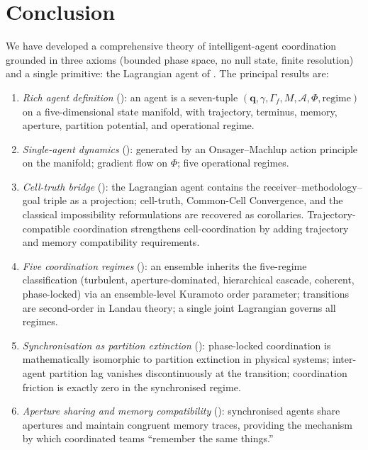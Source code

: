 \documentclass[11pt,twocolumn,a4paper]{article}
\newcommand{\Aper}{\mathcal{A}}
\newcommand{\qvec}{\mathbf{q}}
\newcommand{\Pot}{\Phi}
\begin{document}
\section{Conclusion}
\label{sec:conclusion}

We have developed a comprehensive theory of intelligent-agent
coordination grounded in three axioms (bounded phase space, no null
state, finite resolution) and a single primitive: the Lagrangian
agent of . The principal results are:

\begin{enumerate}[label=(\arabic*),leftmargin=*]
\item \emph{Rich agent definition} (): an agent is a
seven-tuple
$(\qvec,\gamma,\Gamma_f,M,\Aper,\Pot,\mathrm{regime})$ on a
five-dimensional state manifold, with trajectory, terminus, memory,
aperture, partition potential, and operational regime.

\item \emph{Single-agent dynamics} (): generated
by an Onsager--Machlup action principle on the manifold;
gradient flow on $\Pot$; five operational regimes.

\item \emph{Cell-truth bridge} ():
the Lagrangian agent contains the receiver--methodology--goal triple
as a projection; cell-truth, Common-Cell Convergence, and the
classical impossibility reformulations are recovered as corollaries.
Trajectory-compatible coordination strengthens cell-coordination by
adding trajectory and memory compatibility requirements.

\item \emph{Five coordination regimes}
(): an
ensemble inherits the five-regime classification (turbulent,
aperture-dominated, hierarchical cascade, coherent, phase-locked) via
an ensemble-level Kuramoto order parameter; transitions are
second-order in Landau theory; a single joint Lagrangian governs
all regimes.

\item \emph{Synchronisation as partition extinction}
():
phase-locked coordination is mathematically isomorphic to partition
extinction in physical systems; inter-agent partition lag vanishes
discontinuously at the transition; coordination friction is exactly
zero in the synchronised regime.

\item \emph{Aperture sharing and memory compatibility}
(): synchronised agents
share apertures and maintain congruent memory traces, providing the
mechanism by which coordinated teams ``remember the same things.''
\end{enumerate}
\end{document}
